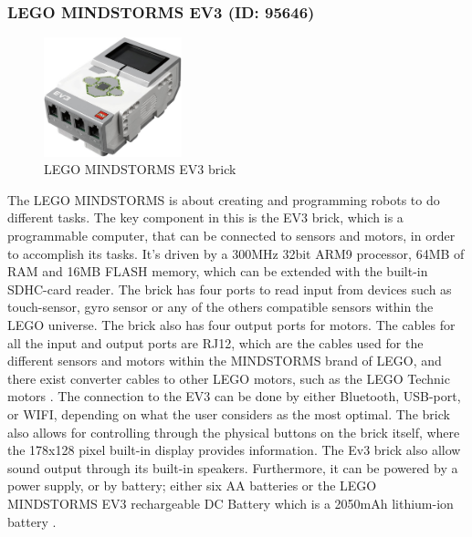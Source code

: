 \subsubsection{LEGO MINDSTORMS EV3 (ID: 95646)}
\begin{figure}[H]
  \centering
  \includegraphics[width=4cm]{images/techAnalysis/LegoEV3.jpg}
  \caption{LEGO MINDSTORMS EV3 brick \cite{BrickOWl-figure-EV3}}\label{fig:sssec:LEGOEV3-EV3}
\end{figure}
The LEGO MINDSTORMS is about creating and programming robots to do different tasks.
The key component in this is the EV3 brick, which is a programmable computer, that can be connected to sensors and motors, in order to accomplish its tasks.
It's driven by a 300MHz 32bit ARM9 processor, 64MB of RAM and 16MB FLASH memory, which can be extended with the built-in SDHC-card reader.
The brick has four ports to read input from devices such as touch-sensor, gyro sensor or any of the others compatible sensors within the LEGO universe.
The brick also has four output ports for motors.
The cables for all the input and output ports are RJ12, which are the cables used for the different sensors and motors within the MINDSTORMS brand of LEGO, and there exist converter cables to other LEGO motors, such as the LEGO Technic motors \cite{LEGO_ev3_nodate}.
The connection to the EV3 can be done by either Bluetooth, USB-port, or WIFI, depending on what the user considers as the most optimal.
The brick also allows for controlling through the physical buttons on the brick itself, where the 178x128 pixel built-in display provides information.
The Ev3 brick also allow sound output through its built-in speakers.
Furthermore, it can be powered by a power supply, or by battery; either six AA batteries or the LEGO MINDSTORMS EV3 rechargeable DC Battery which is a 2050mAh lithium-ion battery \cite{LEGO_lego_nodate2}.
\cite{LEGO_mindstorms_2013-1, LEGO_lego_nodate}

